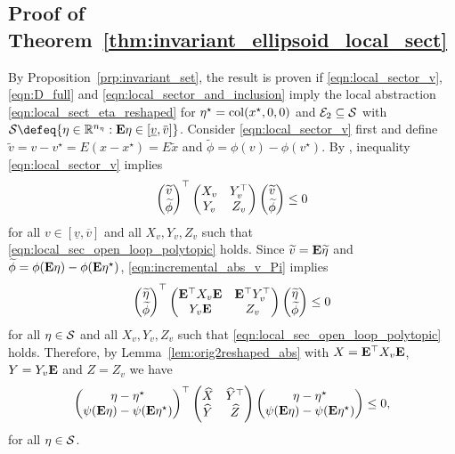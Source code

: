 \documentclass{ifacconf}
\begin{document}
\subsection{Proof of Theorem~\ref{thm:invariant_ellipsoid_local_sect}}\label{sec:proof_thm1}
By Proposition~\ref{prp:invariant_set}, the result is proven if \eqref{eqn:local_sector_v}, \eqref{eqn:D_full} and \eqref{eqn:local_sector_and_inclusion} imply the local abstraction \eqref{eqn:local_sect_eta_reshaped} for $\eta^\star=\operatorname{col}(x^\star, 0, 0)$ and ${\mathcal{E}}_2\subseteq {\mathcal{S}}$ with $\cS\defeq\{\eta\in\RR^{n_\eta}: \bE\eta\in[\underline v,\overbar v]\}$. Consider \eqref{eqn:local_sector_v} first and define $\widetilde v = v-v^\star = E(x-x^\star)=E\widetilde x$ and $\widetilde \phi = \phi(v)-\phi(v^\star)$. By \citep[Lemma 2]{de2023event}, inequality \eqref{eqn:local_sector_v} implies 
\begin{equation}
    \label{eqn:incremental_abs_v_Pi}
    \left(\begin{matrix}\widetilde v\\\widetilde \phi\end{matrix}\right)^\top\left(\begin{matrix}X_v&Y_v^\top\\Y_v&Z_v\end{matrix}\right)\left(\begin{matrix}\widetilde v\\\widetilde \phi\end{matrix}\right)\le 0
\end{equation}
for all $v\in[\underline v,\overbar v]$ and all $X_v,Y_v,Z_v$ such that \eqref{eqn:local_sec_open_loop_polytopic} holds.
Since $\widetilde v={\bf{E}}\widetilde \eta$ and $\widetilde \phi = \phi({\bf{E}}\eta)-\phi({\bf{E}}\eta^\star)$, \eqref{eqn:incremental_abs_v_Pi} implies
\begin{equation}
    \label{eqn:incremental_abs_eta_Pi}
    \left(\begin{matrix}\widetilde \eta\\\widetilde \phi\end{matrix}\right)^\top\left(\begin{matrix}{\bf{E}}^\top X_v {\bf{E}} &{\bf{E}}^\top Y_v^\top\\Y_v{\bf{E}} &Z_v\end{matrix}\right)\left(\begin{matrix}\widetilde \eta\\\widetilde \phi\end{matrix}\right)\le 0
\end{equation}
for all $\eta\in{\mathcal{S}}$ and all $X_v,Y_v,Z_v$ such that \eqref{eqn:local_sec_open_loop_polytopic} holds. Therefore, by Lemma~\ref{lem:orig2reshaped_abs} with $X={\bf{E}}^\top X_v {\bf{E}}$, $Y=Y_v{\bf{E}}$ and $Z = Z_v$
we have 
\begin{equation}
    \label{eqn:local_sect_eta_reshaped_hat}
    \left(\begin{matrix}\eta - \eta^\star\\ \psi({\bf{E}}\eta)-\psi({\bf{E}}\eta^\star)\end{matrix}\right)^\top\left(\begin{matrix}\widehat X &\widehat Y^\top\\\widehat Y& \widehat Z\end{matrix}\right)\left(\begin{matrix}\eta - \eta^\star\\ \psi({\bf{E}}\eta)-\psi({\bf{E}}\eta^\star)\end{matrix}\right)\le 0,
\end{equation}
for all $\eta\in{\mathcal{S}}$. 
\end{document}
